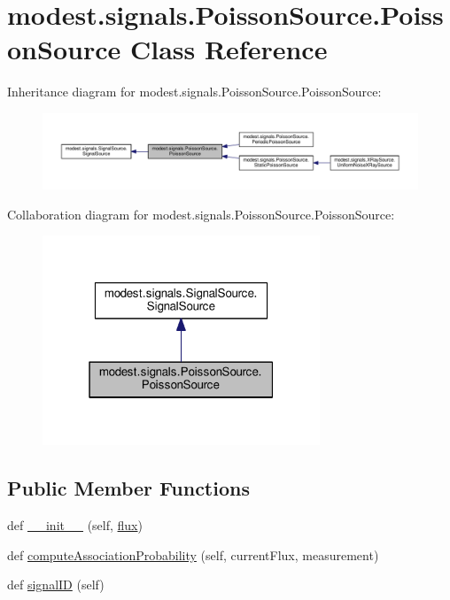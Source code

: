 \hypertarget{classmodest_1_1signals_1_1PoissonSource_1_1PoissonSource}{}\section{modest.\+signals.\+Poisson\+Source.\+Poisson\+Source Class Reference}
\label{classmodest_1_1signals_1_1PoissonSource_1_1PoissonSource}


Inheritance diagram for modest.\+signals.\+Poisson\+Source.\+Poisson\+Source\+:
\nopagebreak
\begin{figure}[H]
\begin{center}
\leavevmode
\includegraphics[width=350pt]{classmodest_1_1signals_1_1PoissonSource_1_1PoissonSource__inherit__graph}
\end{center}
\end{figure}


Collaboration diagram for modest.\+signals.\+Poisson\+Source.\+Poisson\+Source\+:\nopagebreak
\begin{figure}[H]
\begin{center}
\leavevmode
\includegraphics[width=235pt]{classmodest_1_1signals_1_1PoissonSource_1_1PoissonSource__coll__graph}
\end{center}
\end{figure}
\subsection*{Public Member Functions}
\begin{DoxyCompactItemize}
\item 
def \hyperlink{classmodest_1_1signals_1_1PoissonSource_1_1PoissonSource_a82923c4b8dd58df1fc4329a833aed9af}{\+\_\+\+\_\+init\+\_\+\+\_\+} (self, \hyperlink{classmodest_1_1signals_1_1PoissonSource_1_1PoissonSource_ae0a95ae74b0d1df57ed10a7eeb8fa754}{flux})
\item 
def \hyperlink{classmodest_1_1signals_1_1PoissonSource_1_1PoissonSource_a86d80fd2ac349efd7df5184800afe7da}{compute\+Association\+Probability} (self, current\+Flux, measurement)
\item 
def \hyperlink{classmodest_1_1signals_1_1SignalSource_1_1SignalSource_af652db2ed97925595d650fd909d6a2d4}{signal\+ID} (self)
\end{DoxyCompactItemize}
